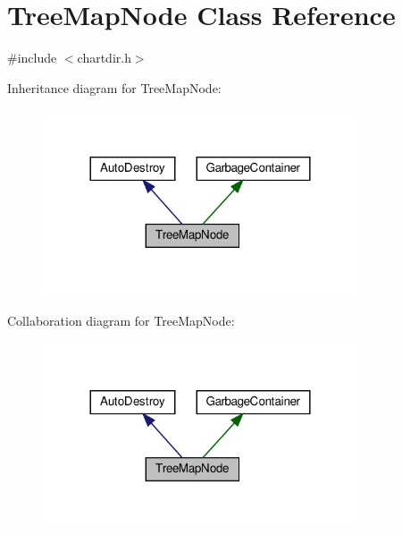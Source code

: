 \hypertarget{class_tree_map_node}{}\section{Tree\+Map\+Node Class Reference}
\label{class_tree_map_node}


{\ttfamily \#include $<$chartdir.\+h$>$}



Inheritance diagram for Tree\+Map\+Node\+:
\nopagebreak
\begin{figure}[H]
\begin{center}
\leavevmode
\includegraphics[width=264pt]{class_tree_map_node__inherit__graph}
\end{center}
\end{figure}


Collaboration diagram for Tree\+Map\+Node\+:
\nopagebreak
\begin{figure}[H]
\begin{center}
\leavevmode
\includegraphics[width=264pt]{class_tree_map_node__coll__graph}
\end{center}
\end{figure}
